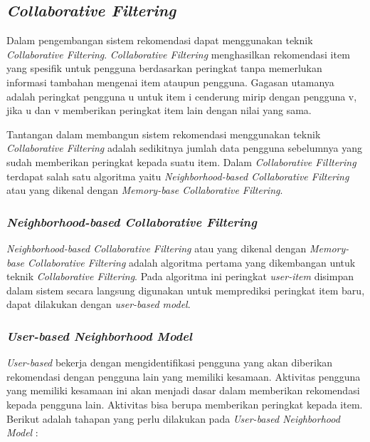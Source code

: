 \subsection{\textit{Collaborative Filtering}}
\label{sec:collaborative filtering}
Dalam pengembangan sistem rekomendasi dapat menggunakan teknik \textit{Collaborative Filtering}. \textit{Collaborative Filtering} \cite{buku:sistem:rekomendasi} menghasilkan rekomendasi item yang spesifik untuk pengguna berdasarkan peringkat tanpa memerlukan informasi tambahan mengenai item ataupun pengguna. Gagasan utamanya adalah peringkat pengguna u untuk item i cenderung mirip dengan pengguna v, jika u dan v memberikan peringkat item lain dengan nilai yang sama. 

	
Tantangan dalam membangun sistem rekomendasi menggunakan teknik \textit{Collaborative Filtering} adalah sedikitnya jumlah data pengguna sebelumnya yang sudah memberikan peringkat kepada suatu item. Dalam \textit{Collaborative Filltering} terdapat salah satu algoritma yaitu \textit{Neighborhood-based Collaborative Filtering} atau yang dikenal dengan \textit{Memory-base Collaborative Filtering}.
	
\subsubsection{\textit{Neighborhood-based Collaborative Filtering}}
\label{subsec:neighborhood}
\textit{Neighborhood-based Collaborative Filtering} \cite{buku:sistem:rekomendasi} atau yang dikenal dengan \textit{Memory-base Collaborative Filtering} adalah algoritma pertama yang dikembangan untuk teknik \textit{Collaborative Filtering}. Pada algoritma ini peringkat \textit{user-item} disimpan dalam sistem secara langsung digunakan untuk memprediksi peringkat item baru, dapat dilakukan dengan \textit{user-based model}. %

\subsubsection{\textit{User-based Neighborhood Model}}
\label{user-based}
\textit{User-based} \cite{buku:sistem:rekomendasi} bekerja dengan mengidentifikasi pengguna yang akan diberikan rekomendasi dengan pengguna lain yang memiliki kesamaan. Aktivitas pengguna yang memiliki kesamaan ini akan menjadi dasar dalam memberikan rekomendasi kepada pengguna lain. Aktivitas bisa berupa memberikan peringkat kepada item. Berikut adalah tahapan yang perlu dilakukan pada \textit{User-based Neighborhood Model} : 

